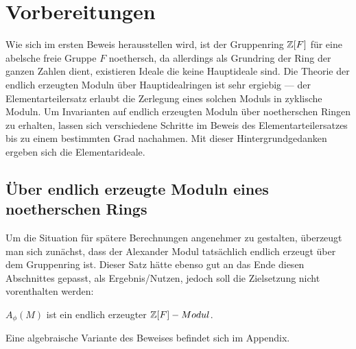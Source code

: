 
\section{Vorbereitungen}


Wie sich im ersten Beweis herausstellen wird, ist der Gruppenring $\mathbb{Z}[F]$ für eine abelsche freie Gruppe $F$ noethersch, da allerdings als Grundring der Ring der ganzen Zahlen dient, existieren Ideale die keine Hauptideale sind. Die Theorie der endlich erzeugten Moduln über Hauptidealringen ist sehr ergiebig --- der Elementarteilersatz erlaubt die Zerlegung eines solchen Moduls in zyklische Moduln. Um Invarianten auf endlich erzeugten Moduln über noetherschen Ringen zu erhalten, lassen sich verschiedene Schritte im Beweis des Elementarteilersatzes bis zu einem bestimmten Grad nachahmen. Mit dieser Hintergrundgedanken ergeben sich die Elementarideale. 

\subsection{Über endlich erzeugte Moduln eines noetherschen Rings}



Um die Situation für spätere Berechnungen angenehmer zu gestalten, überzeugt man sich zunächst, dass der Alexander Modul tatsächlich endlich erzeugt über dem Gruppenring ist. Dieser Satz hätte ebenso gut an das Ende diesen Abschnittes gepasst, als Ergebnis/Nutzen, jedoch soll die Zielsetzung nicht vorenthalten werden: 
\begin{prop}
\label{prop:alexendlerz}
		$A_\phi(M)$ ist ein endlich erzeugter $\mathbb{Z}[F]-Modul$.
\end{prop}
\begin{bem}\label{rem:AlexModulendlerz}
	Eine algebraische Variante des Beweises befindet sich im Appendix. 
\end{bem}

